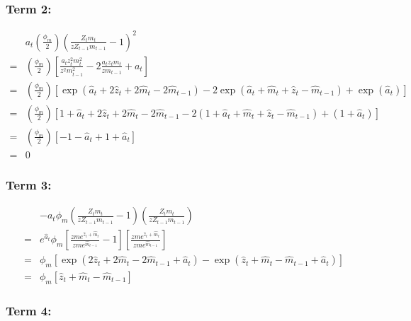 \documentclass[11pt,preprint, authoryear]{elsarticle}
\numberwithin{equation}{section}
\numberwithin{figure}{section}
\numberwithin{table}{section}
\begin{document}
\hypertarget{term-2-1}{%
\subsubsection{Term 2:}\label{term-2-1}}

\[\begin{aligned}&a_{t}\left(\frac{\phi_{m}}{2}\right)\left(\frac{Z_t m_t }{z Z_{t-1}m_{t-1}}-1\right)^{2}\\
=& \left(\frac{\phi_{m}}{2}\right) \left[ \frac{a_{t} z_{t}^{2} m_{t}^{2}}{z^{2} m_{t-1}^{2}} - 2 \frac{a_{t} z_{t} m_{t}}{z m_{t-1}} + a_{t} \right]\\
=& \left(\frac{\phi_{m}}{2}\right) \left[ \exp(\hat{a}_{t}+2 \hat{z}_{t}+2 \hat{m}_{t}-2 \hat{m}_{t-1})-2 \exp(\hat{a}_{t}+\hat{m}_{t}+\hat{z}_{t}-\hat{m}_{t-1})+ \exp(\hat{a}_{t}) \right] \\
=& \left(\frac{\phi_{m}}{2}\right) \left[ 1 + \hat{a}_{t}+2 \hat{z}_{t}+2 \hat{m}_{t}-2 \hat{m}_{t-1} - 2( 1 + \hat{a}_{t}+\hat{m}_{t}+\hat{z}_{t}-\hat{m}_{t-1}) + (1 + \hat{a}_{t}) \right] \\
=& \left(\frac{\phi_{m}}{2}\right) \left[ -1 - \hat{a}_t + 1 + \hat{a}_t \right]\\
=& 0
\end{aligned}\]

\hypertarget{term-3-1}{%
\subsubsection{Term 3:}\label{term-3-1}}

\[\begin{aligned} &-a_{t} \phi_{m}\left(\frac{Z_t m_t }{z Z_{t-1}m_{t-1}} - 1\right)\left(\frac{Z_t m_t }{z Z_{t-1}m_{t-1}}\right)\\
=& e^{\hat{a}_{t}} \phi_{m}\left[\frac{z m e^{\hat{z}_{t}+\hat{m}_{t}}}{z m e^{\hat{m}_{t-1}}}-1\right]\left[\frac{z m e^{\hat{z}_{t}+\hat{m}_{t}}}{z m e^{\hat{m}_{t-1}}}\right]\\
=& \phi_m \left[ \exp \left(2 \hat{z}_{t}+2 \hat{m}_{t}-2 \hat{m}_{t-1}+\hat{a}_{t}\right)-\exp \left(\hat{z}_{t}+\hat{m}_{t}-\hat{m}_{t-1}+\hat{a}_{t}\right) \right]\\
=& \phi_m \left[\hat{z}_{t}+\hat{m}_{t}-\hat{m}_{t-1}\right]
\end{aligned}\]

\hypertarget{term-4-1}{%
\subsubsection{Term 4:}\label{term-4-1}}
\end{document}
